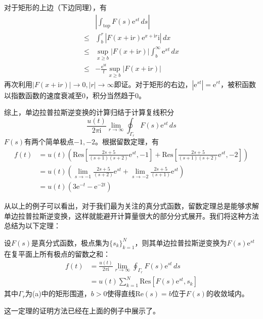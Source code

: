 \begin{example}
    对于矩形的上边（下边同理），有\begin{align*}
        &\left|\int_{\mathrm{top}}F(s)\mathrm{e}^{st}\,ds\right|\\
        \leq&\int_{b}^{r}\left|F(x+\mathrm{i}r)\mathrm{e}^{x+\mathrm{i}r}\mathrm{i}\right|\,dx\\
        \leq& \sup_{x\geq b}\left|F(x+\mathrm{i}r)\right|\int_{b}^{\infty}\mathrm{e}^{xt}\,dx\\
        \leq& -\frac{\mathrm{e}^{bt}}{t}\sup_{x\geq b}\left|F(x+\mathrm{i}r)\right|
    \end{align*}
    再次利用$|F(x+\mathrm{i}r)|\to 0,|r|\to\infty$即证。对于矩形的右边，$|\mathrm{e}^{st}|=\mathrm{e}^{rt}$，被积函数以指数函数的速度衰减至0，积分当然趋于0。
    
    综上，单边拉普拉斯逆变换的计算归结于计算复线积分
    \[\frac{u(t)}{2\pi \mathrm{i}}\lim_{r\to\infty}\oint_{\Gamma_r}F(s)\mathrm{e}^{st}\,ds\]
    $F(s)$有两个简单极点$-1,-2$。根据留数定理，有
    \begin{align*}
        f(t)&=u(t)\left(\mathrm{Res}\left[\frac{2s+5}{(s+1)(s+2)}\mathrm{e}^{st},-1\right]+\mathrm{Res}\left[\frac{2s+5}{(s+1)(s+2)}\mathrm{e}^{st},-2\right]\right)\\
        &=u(t)\left(\lim_{s\to -1}\frac{2s+5}{(s+2)}\mathrm{e}^{st}+\lim_{s\to -2}\frac{2s+5}{(s+1)}\mathrm{e}^{st}\right)\\
        &=u(t)(3\mathrm{e}^{-t}-\mathrm{e}^{-2t})
    \end{align*}
\end{example}

从以上的例子可以看出，对于我们最为关注的真分式函数，留数定理总是能够求解单边拉普拉斯逆变换，这样就能避开计算量很大的部分分式展开。我们将这种方法总结为以下定理：
\begin{theorem}
    设$F(s)$是真分式函数，极点集为$\{s_k\}_{k=1}^{N}$，则其单边拉普拉斯逆变换为$F(s)\mathrm{e}^{st}$在复平面上所有极点的留数之和：
    \begin{align*}
        f(t)&=\frac{u(t)}{2\pi \mathrm{i}}\lim_{r\to\infty}\oint_{\Gamma_r}F(s)\mathrm{e}^{st}\,ds\\
        &=u(t)\sum_{k=1}^{N}\mathrm{Res}[F(s)\mathrm{e}^{st},s_k]
    \end{align*}
    其中$\Gamma_r$为(a)中的矩形围道，$b>0$使得直线$\mathrm{Re}(s)=b$位于$F(s)$的收敛域内。
\end{theorem}

这一定理的证明方法已经在上面的例子中展示了。

